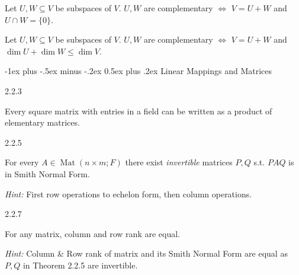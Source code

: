 \documentclass[10pt]{article} %
\makeatletter
\renewcommand{\leq}{\leqslant}
\DeclareMathOperator{\Mat}{Mat}
\newcommand{\Hint}{\vspace{0.2em}\textit{Hint: }}
\renewcommand{\section}{\@startsection{section}{1}{0mm}%
                                {-1ex plus -.5ex minus -.2ex}%
                                {0.5ex plus .2ex}%
                                {\normalfont\large\bfseries}}
\makeatother
\begin{document}
\begin{multicols}{3}
\begin{exercise}{18}{}
\end{exercise}

\begin{exercise}{19}{}

    Let $U,W \subseteq V$ be subspaces of $V$. $U,W$ are complementary $\Leftrightarrow$ $V = U + W$ and $U \cap W = \{0\}$.

\end{exercise}

\begin{exercise}{20}{}

    Let $U,W \subseteq V$ be subspaces of $V$. $U,W$ are complementary $\Leftrightarrow$ $V = U + W$ and $\dim{U} + \dim{W} \leq \dim{V}$.

\end{exercise}


\section{Linear Mappings and Matrices}

\begin{theorem}{2.2.3}{}

    Every square matrix with entries in a field can be written as a product of elementary matrices.

\end{theorem}

\begin{theorem}{2.2.5}{}

    For every $A \in \Mat(n \times m;F)$ there exist \emph{invertible} matrices $P,Q$ s.t. $PAQ$ is in Smith Normal Form.

    \Hint First row operations to echelon form, then column operations.

\end{theorem}

\begin{theorem}{2.2.7}{}

    For any matrix, column and row rank are equal.

    \Hint Column \& Row rank of matrix and its Smith Normal Form are equal as $P,Q$ in Theorem 2.2.5 are invertible.


\end{theorem}
\end{multicols}
\end{document}
